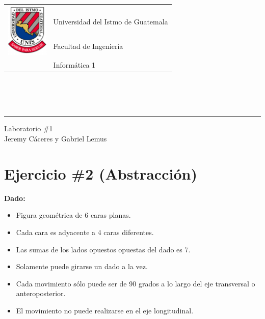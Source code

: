 \documentclass[11pt,letterpaper]{article}
\begin{document}

\begin{tabular}{l l}
\multirow{3}{*}{\includegraphics[width=2cm]{../../recursos/logo}} 
 & \\
 & \Large Universidad del Istmo de Guatemala \\
 & \Large Facultad de Ingeniería \\
 & \Large Informática 1 \\
\end{tabular}
\\\\\\

\begin{center}
	\hrule
	\vspace{0.5cm}
	\huge{Laboratorio \#1} \\
	\vspace{0.1cm}
    \Large{Jeremy Cáceres y Gabriel Lemus}\\
    \vspace{0.05cm}
    \hrulefill
\end{center}
\vspace{0.2cm}

\section*{\textbf{Ejercicio \#2 (Abstracción)}}
\textbf{Dado:}

\begin{itemize}
\item Figura geométrica de 6 caras planas.
\item Cada cara es adyacente a 4 caras diferentes.
\item Las sumas de los  lados opuestos opuestas del dado es 7.
\item Solamente puede girarse un dado a la vez.
\item Cada movimiento sólo puede ser de 90 grados a lo largo del eje transversal o anteroposterior.
\item El movimiento no puede realizarse en el eje longitudinal.
\end{itemize}
\vspace{0.1cm}
\end{document}
